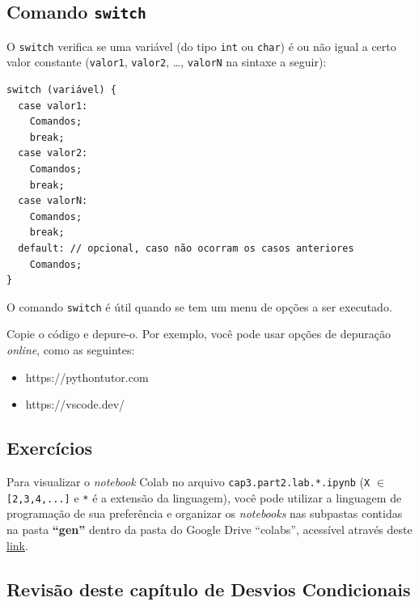 \documentclass[12pt,a4paper]{article}
\providecommand{\tightlist}{%
      \setlength{\itemsep}{0pt}\setlength{\parskip}{0pt}}
\begin{document}
    \hypertarget{comando-switch}{%
\subsection{\texorpdfstring{Comando
\texttt{switch}}{Comando switch}}\label{comando-switch}}

    O \texttt{switch} verifica se uma variável (do tipo \texttt{int} ou
\texttt{char}) é ou não igual a certo valor constante (\texttt{valor1},
\texttt{valor2}, \ldots{}, \texttt{valorN} na sintaxe a seguir):

\begin{verbatim}
switch (variável) {
  case valor1:
    Comandos;
    break;
  case valor2:
    Comandos;
    break;
  case valorN:
    Comandos;
    break;
  default: // opcional, caso não ocorram os casos anteriores
    Comandos;
}
\end{verbatim}

O comando \texttt{switch} é útil quando se tem um menu de opções a ser
executado.

    Copie o código e depure-o. Por exemplo, você pode usar opções de
depuração \emph{online}, como as seguintes:

\begin{itemize}
\tightlist
\item
  https://pythontutor.com
\item
  https://vscode.dev/
\end{itemize}

    \hypertarget{exercuxedcios}{%
\subsection{Exercícios}\label{exercuxedcios}}

    Para visualizar o \emph{notebook} Colab no arquivo
\texttt{cap3.part2.lab.*.ipynb} (\texttt{X} \(\in\)
\texttt{{[}2,3,4,...{]}} e \texttt{*} é a extensão da linguagem), você
pode utilizar a linguagem de programação de sua preferência e organizar
os \emph{notebooks} nas subpastas contidas na pasta \textbf{``gen''}
dentro da pasta do Google Drive ``colabs'', acessível através deste
\href{https://drive.google.com/drive/folders/1YlFwv8XYN7PYYf-HwDMlkxzbmXzJw9cM?usp=sharing}{link}.

    \hypertarget{revisuxe3o-deste-capuxedtulo-de-desvios-condicionais}{%
\subsection{Revisão deste capítulo de Desvios
Condicionais}\label{revisuxe3o-deste-capuxedtulo-de-desvios-condicionais}}
\end{document}
